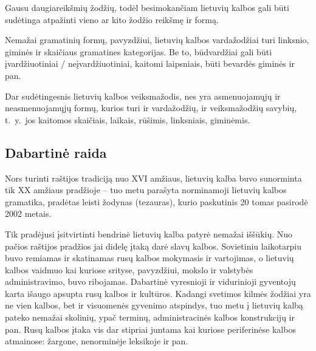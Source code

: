 \begin{multicols}{2}
Gausu daugiareikšmių žodžių, todėl besimokančiam lietuvių kalbos gali būti sudėtinga atpažinti vieno ar kito žodžio reikšmę ir formą.

Nemažai gramatinių formų, pavyzdžiui, lietuvių kalbos vardažodžiai turi linksnio, giminės ir skaičiaus gramatines kategorijas. Be to, būdvardžiai gali būti įvardžiuotiniai / neįvardžiuotiniai, kaitomi laipsniais, būti bevardės giminės ir pan.

Dar sudėtingesnis lietuvių kalbos veiksmažodis, nes yra asmenuojamųjų ir neasmenuojamųjų formų, kurios turi ir vardažodžių, ir veiksmažodžių savybių, t.~y.~jos kaitomos skaičiais, laikais, rūšimis, linksniais, giminėmis.


\subsection{Dabartinė raida}

Nors turinti raštijos tradiciją nuo XVI amžiaus, lietuvių kalba buvo sunorminta tik XX amžiaus pradžioje – tuo metu parašyta norminamoji lietuvių kalbos gramatika, pradėtas leisti žodynas (tezauras), kurio paskutinis 20 tomas pasirodė 2002 metais.  

Tik pradėjusi įsitvirtinti bendrinė lietuvių kalba patyrė nemažai iššūkių. Nuo pačios raštijos pradžios jai didelę įtaką darė slavų kalbos. Sovietiniu laikotarpiu buvo remiamas ir skatinamas rusų kalbos mokymasis ir vartojimas, o lietuvių kalbos vaidmuo kai kuriose srityse, pavyzdžiui, mokslo ir valstybės administravimo, buvo ribojamas. Dabartinė vyresnioji ir vidurinioji gyventojų karta išaugo apsupta rusų kalbos ir kultūros. Kadangi svetimos kilmės žodžiai yra ne vien kalbos, bet ir visuomenės gyvenimo atspindys, tuo metu į lietuvių kalbą pateko nemažai skolinių, ypač terminų, administracinės kalbos konstrukcijų ir pan. Rusų kalbos įtaka vis dar stipriai juntama kai kuriose periferinėse kalbos atmainose: žargone, nenorminėje leksikoje ir pan.


\end{multicols}

